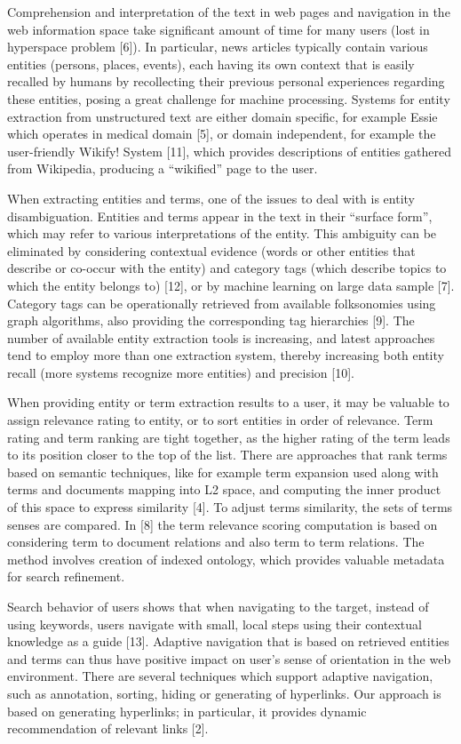 \documentclass{llncs}
\begin{document}
Comprehension and interpretation of the text in web pages and navigation in the web information space take significant amount of time for many users (lost in hyperspace problem [6]). In particular, news articles typically contain various entities (persons, places, events), each having its own context that is easily recalled by humans by recollecting their previous personal experiences regarding these entities, posing a great challenge for machine processing. Systems for entity extraction from unstructured text are either domain specific, for example Essie which operates in medical domain [5], or domain independent, for example the user-friendly Wikify! System [11], which provides descriptions of entities gathered from Wikipedia, producing a “wikified” page to the user. 

When extracting entities and terms, one of the issues to deal with is entity disambiguation. Entities and terms appear in the text in their “surface form”, which may refer to various interpretations of the entity. This ambiguity can be eliminated by considering contextual evidence (words or other entities that describe or co-occur with the entity) and category tags (which describe topics to which the entity belongs to) [12], or by machine learning on large data sample [7]. Category tags can be operationally retrieved from available folksonomies using graph algorithms, also providing the corresponding tag hierarchies [9]. The number of available entity extraction tools is increasing, and latest approaches tend to employ more than one extraction system, thereby increasing both entity recall (more systems recognize more entities) and precision [10]. 

When providing entity or term extraction results to a user, it may be valuable to assign relevance rating to entity, or to sort entities in order of relevance. Term rating and term ranking are tight together, as the higher rating of the term leads to its position closer to the top of the list. There are approaches that rank terms based on semantic techniques, like for example term expansion used along with terms and documents mapping into L2 space, and computing the inner product of this space to express similarity [4]. To adjust terms similarity, the sets of terms senses are compared. In [8] the term relevance scoring computation is based on considering term to document relations and also term to term relations. The method involves creation of indexed ontology, which provides valuable metadata for search refinement. 

Search behavior of users shows that when navigating to the target, instead of using keywords, users navigate with small, local steps using their contextual knowledge as a guide [13]. Adaptive navigation that is based on retrieved entities and terms can thus have positive impact on user's sense of orientation in the web environment. There are several techniques which support adaptive navigation, such as annotation, sorting, hiding or generating of hyperlinks. Our approach is based on generating hyperlinks; in particular, it provides dynamic recommendation of relevant links [2]. 
\end{document}
